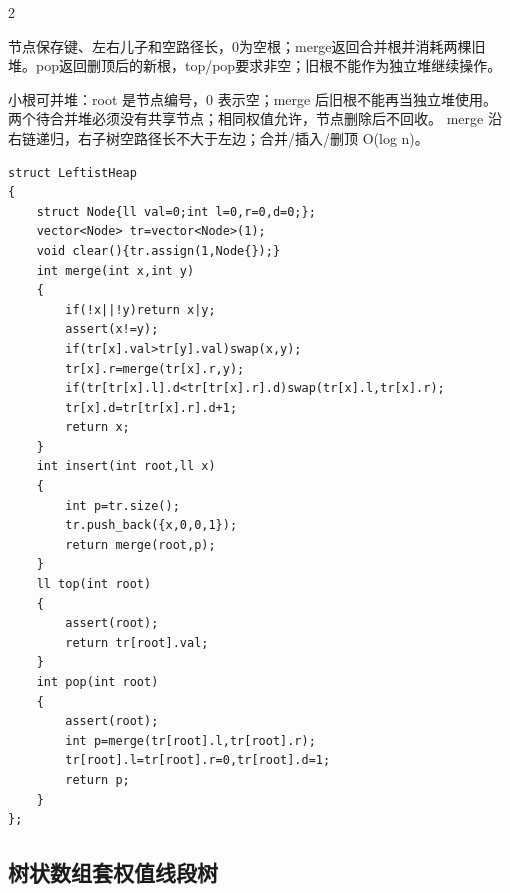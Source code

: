\documentclass[UTF8,fontset=fandol,a4paper,twoside]{ctexart}
\newcommand{\note}[1]{{\fontsize{10}{12}\selectfont #1\par}}
\begin{document}
\begin{multicols}{2}
\note{节点保存键、左右儿子和空路径长，0为空根；merge返回合并根并消耗两棵旧堆。pop返回删顶后的新根，top/\allowbreak{}pop要求非空；旧根不能作为独立堆继续操作。}
\note{小根可并堆：root 是节点编号，0 表示空；merge 后旧根不能再当独立堆使用。 两个待合并堆必须没有共享节点；相同权值允许，节点删除后不回收。 merge 沿右链递归，右子树空路径长不大于左边；合并/\allowbreak{}插入/\allowbreak{}删顶 O(\allowbreak{}log n)\allowbreak{}。}
\begin{lstlisting}
struct LeftistHeap
{
    struct Node{ll val=0;int l=0,r=0,d=0;};
    vector<Node> tr=vector<Node>(1);
    void clear(){tr.assign(1,Node{});}
    int merge(int x,int y)
    {
        if(!x||!y)return x|y;
        assert(x!=y);
        if(tr[x].val>tr[y].val)swap(x,y);
        tr[x].r=merge(tr[x].r,y);
        if(tr[tr[x].l].d<tr[tr[x].r].d)swap(tr[x].l,tr[x].r);
        tr[x].d=tr[tr[x].r].d+1;
        return x;
    }
    int insert(int root,ll x)
    {
        int p=tr.size();
        tr.push_back({x,0,0,1});
        return merge(root,p);
    }
    ll top(int root)
    {
        assert(root);
        return tr[root].val;
    }
    int pop(int root)
    {
        assert(root);
        int p=merge(tr[root].l,tr[root].r);
        tr[root].l=tr[root].r=0,tr[root].d=1;
        return p;
    }
};
\end{lstlisting}
\subsection{树状数组套权值线段树}


\end{multicols}
\end{document}
